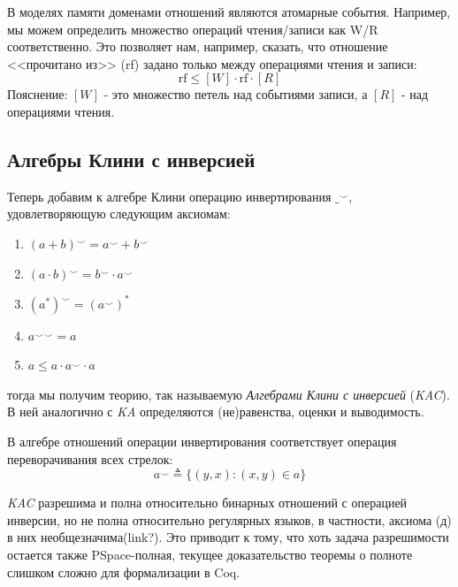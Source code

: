\documentclass[times
              ]{itmo-student-thesis}
\begin{document}
      В моделях памяти доменами отношений являются атомарные события. Например, мы можем определить множество
      операций чтения/записи как W/R соответственно.
      Это позволяет нам, например, сказать, что отношение <<прочитано из>> (rf) задано только между
      операциями чтения и записи\cite{rc11}:
      $$ \text{rf} \leq [W] \cdot \text{rf} \cdot [R] $$
      Пояснение: $ [W] $ - это множество петель над событиями записи, а $[R]$ - над операциями чтения.


    \subsection{Алгебры Клини с инверсией}
      Теперь добавим к алгебре Клини операцию инвертирования $ \_^{\smile} $, удовлетворяющую следующим аксиомам:
      \begin{enumerate}
        \item $ (a + b)^{\smile} = a^{\smile} + b^{\smile} $
        \item $ (a \cdot b)^{\smile} = b^{\smile} \cdot a^{\smile} $
        \item $ (a^*)^{\smile} = (a^{\smile})^* $
        \item $ {a^{\smile}}^{\smile} = a $
        \item $ a \leq a \cdot a^{\smile} \cdot a $
      \end{enumerate}
      тогда мы получим теорию, так называемую \textit{Алгебрами Клини с инверсией} (\textit{KAC}).
      В ней аналогично с \textit{KA} определяются (не)равенства, оценки и выводимость.

      В алгебре отношений операции инвертирования соответствует операция переворачивания всех стрелок:
      $$ a^\smile \triangleq \{ (y, x): (x, y) \in a \} $$

      \textit{KAC} разрешима и полна относительно бинарных отношений с операцией инверсии, но не полна
      относительно регулярных языков, в частности, аксиома (д) в них необщезначима(link?).
      Это приводит к тому, что хоть задача разрешимости остается также PSpace-полная, текущее
      доказательство теоремы о полноте слишком сложно для формализации в Coq\cite{AlgebrasOfRelation}.
\end{document}
